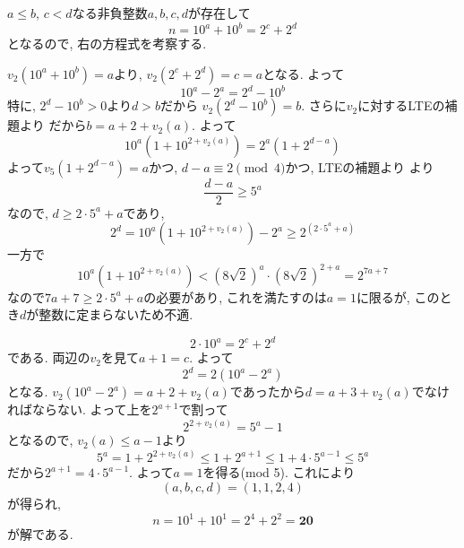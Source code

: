 $a\leq b$, $c < d$なる非負整数$a,b,c,d$が存在して
\[
n = 10^{a} + 10^{b} = 2^c + 2^d
\]
となるので, 右の方程式を考察する.

\noindent {}

$v_2(10^{a} + 10^{b}) = a$より, $v_2(2^c + 2^d) = c = a$となる. よって
\[
10^{a} - 2^a = 2^d - 10^{b}
\]
特に, $2^d - 10^b > 0$より$d>b$だから $v_2(2^d - 10^b) = b$. さらに$v_2$に対するLTEの補題より
だから$b = a + 2 + v_2(a)$. よって
\[
10^{a}(1 + 10^{2 + v_2(a)}) = 2^a(1 + 2^{d-a})
\]
よって$v_{5}(1 + 2^{d-a}) = a$かつ, $d-a\equiv 2\pmod{4}$かつ, LTEの補題より
より
\[
\frac{d-a}{2} \geq 5^{a}
\]
なので, $d\geq 2\cdot 5^{a} + a$であり,
\[
2^{d} = 10^{a}(1 + 10^{2 + v_2(a)}) - 2^a \geq 2^{(2\cdot 5^{a} + a)}
\]
一方で
\[
10^{a}(1 + 10^{2+v_2(a)}) < (8\sqrt{2})^{a}\cdot (8\sqrt{2})^{2+a} = 2^{7a + 7}
\]
なので$7a + 7 \geq 2\cdot 5^a + a$の必要があり, これを満たすのは$a=1$に限るが, このとき$d$が整数に定まらないため不適.

\noindent{}
\[2\cdot 10^{a} = 2^{c} + 2^d\]
である. 両辺の$v_2$を見て$a+1 = c$. よって
\[
2^d = 2(10^{a} - 2^a)
\]
となる. $v_2(10^{a} - 2^a) = a+2+v_2(a)$であったから$d = a+3+v_2(a)$でなければならない. よって上を$2^{a+1}$で割って
\[
2^{2 + v_2(a)} = 5^a - 1
\]
となるので, $v_2(a) \leq a-1$より
\[
5^a = 1 + 2^{2 + v_2(a)} \leq 1 + 2^{a+1} \leq 1 + 4\cdot 5^{a-1} \leq 5^{a}
\]
だから$2^{a+1} = 4\cdot 5^{a-1}$. よって$a=1$を得る(mod 5). これにより
\[
(a,b,c,d) = (1,1,2,4)
\]
が得られ,
\[
n = 10^{1} + 10^{1} = 2^{4} + 2^{2} = \boldsymbol{20}
\]
が解である. 
